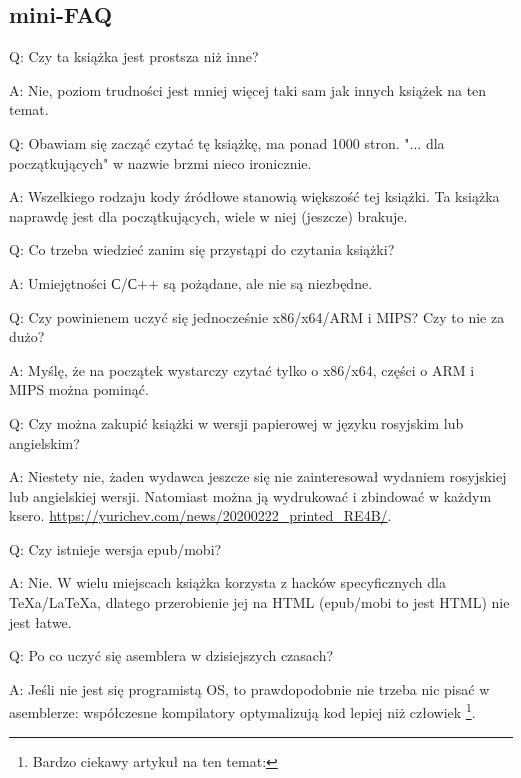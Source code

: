\subsection*{mini-FAQ}

\par Q: Czy ta książka jest prostsza niż inne?
\par A: Nie, poziom trudności jest mniej więcej taki sam jak innych książek na ten temat.

\par Q: Obawiam się zacząć czytać tę książkę, ma ponad 1000 stron.
"... dla początkujących" w nazwie brzmi nieco ironicznie.
\par A: Wszelkiego rodzaju kody źródłowe stanowią większość tej książki.
Ta książka naprawdę jest dla początkujących, wiele w niej (jeszcze) brakuje.

\par Q: Co trzeba wiedzieć zanim się przystąpi do czytania książki?
\par A: Umiejętności С/С++ są pożądane, ale nie są niezbędne.

\par Q: Czy powinienem uczyć się jednocześnie x86/x64/ARM i MIPS? Czy to nie za dużo?
\par A: Myślę, że na początek wystarczy czytać tylko o x86/x64, części o ARM i MIPS można pominąć.

\par Q: Czy można zakupić książki w wersji papierowej w języku rosyjskim lub angielskim?
\par A: Niestety nie, żaden wydawca jeszcze się nie zainteresował wydaniem rosyjskiej lub angielskiej wersji. Natomiast można ją wydrukować i zbindować w każdym ksero.
\url{https://yurichev.com/news/20200222_printed_RE4B/}.

\par Q: Czy istnieje wersja epub/mobi?
\par A: Nie. W wielu miejscach książka korzysta z hacków specyficznych dla TeXa/LaTeXa, dlatego przerobienie jej na HTML
(epub/mobi to jest HTML) nie jest łatwe.

\par Q: Po co uczyć się asemblera w dzisiejszych czasach?
\par A: Jeśli nie jest się programistą \ac{OS}, to prawdopodobnie nie trzeba nic pisać w asemblerze: współczesne kompilatory optymalizują kod lepiej niż człowiek \footnote{Bardzo ciekawy artykuł na ten temat: \InSqBrackets{\AgnerFog}}.

